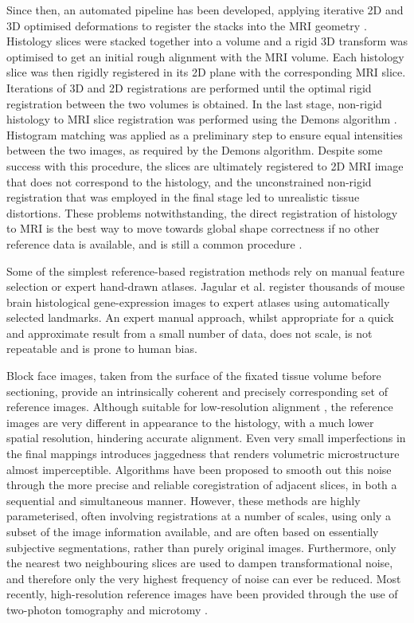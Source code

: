   Since then, an automated pipeline has been developed, applying iterative 2D and 3D optimised deformations to register the stacks into the MRI geometry \cite{Mansoori2007}. Histology slices were stacked together into a volume and a rigid 3D transform was optimised to get an initial rough alignment with the MRI volume. Each histology slice was then rigidly registered in its 2D plane with the corresponding MRI slice. Iterations of 3D and 2D registrations are performed until the optimal rigid registration between the two volumes is obtained. In the last stage, non-rigid histology to MRI slice registration was performed using the Demons algorithm \cite{Thirion1995}. Histogram matching was applied as a preliminary step to ensure equal intensities between the two images, as required by the Demons algorithm. Despite some success with this procedure, the slices are ultimately registered to 2D MRI image that does not correspond to the histology, and the unconstrained non-rigid registration that was employed in the final stage led to unrealistic tissue distortions. These problems notwithstanding, the direct registration of histology to MRI is the best way to move towards global shape correctness if no other reference data is available, and is still a common procedure \cite{Alic2011,Osechinskiy2011,Kimm2012}.
  
  Some of the simplest reference-based registration methods rely on manual feature selection or expert hand-drawn atlases. Jagular et al. \cite{Jagalur2007} register thousands of mouse brain histological gene-expression images to expert atlases using automatically selected landmarks. An expert manual approach, whilst appropriate for a quick and approximate result from a small number of data, does not scale, is not repeatable and is prone to human bias.
  
  Block face images, taken from the surface of the fixated tissue volume before sectioning, provide an intrinsically coherent and precisely corresponding set of reference images. Although suitable for low-resolution alignment  \cite{Palm2010}, the reference images are very different in appearance to the histology, with a much lower spatial resolution, hindering accurate alignment. Even very small imperfections in the final mappings introduces jaggedness that renders volumetric microstructure almost imperceptible. Algorithms have been proposed to smooth out this noise through the more precise and reliable coregistration of adjacent slices, in both a sequential \cite{Yushkevich2006,Chakravarty2008} and simultaneous \cite{Feuerstein2011} manner. However, these methods are highly parameterised, often involving registrations at a number of scales, using only a subset of the image information available, and are often based on essentially subjective segmentations, rather than purely original images. Furthermore, only the nearest two neighbouring slices are used to dampen transformational noise, and therefore only the very highest frequency of noise can ever be reduced. Most recently, high-resolution reference images have been provided through the use of two-photon tomography and microtomy \cite{Huang2009,Ragan2012}.
  
